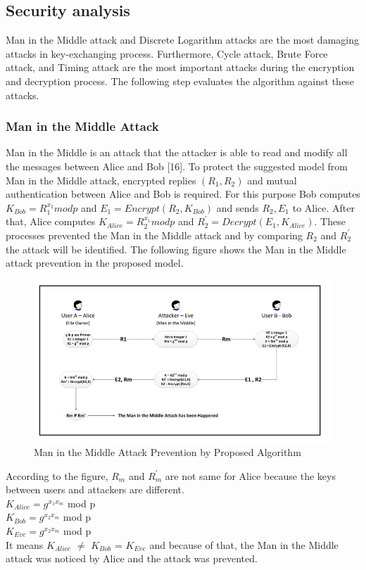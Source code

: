 \pagebreak
\subsection{Security analysis}
Man in the Middle attack and Discrete Logarithm attacks
are the most damaging attacks in key-exchanging process.
Furthermore, Cycle attack, Brute Force attack, and Timing
attack are the most important attacks during the encryption
and decryption process. The following step evaluates the
algorithm against these attacks.
\subsubsection{Man in the Middle Attack}
Man in the Middle is an attack that the attacker is able to
read and modify all the messages between Alice and Bob [16].
To protect the suggested model from Man in the Middle
attack, encrypted replies $(R_{1},R_{2})$ and mutual
authentication between Alice  and Bob  is
required. For this purpose Bob computes
$K_{Bob} = R_{1}^{x_{2}} mod p$
and $E_{1}=Encrypt(R_{2},K_{Bob})$ and sends $ R_{2},E_{1}$ to Alice.
After that, Alice computes $K_{Alice} = R_{2}^{x_{1}} mod p$
and $R^{'}_{2}=Decrypt(E_{1},K_{Alice}).$
These processes prevented the Man in the Middle attack and by comparing $R_{2}$ and $R^{'}_{2}$ the attack will be identified. The following figure shows the Man in the Middle attack prevention in the proposed model.

\vspace{-10pt}
\begin{figure}[H]
	\centering
	\includegraphics[width=160mm]{images/maninmiddle.png}{}
	\caption{ Man in the Middle Attack Prevention by Proposed Algorithm} %
	\label{figmaninmiddle} %
\end{figure}

According to the figure, $R_{m}$ and $R^{'}_{m}$ are not same for
Alice because the keys between users and attackers are
different.\\
{$K_{Alice} = g^{x_{1}{x_{m}}}$ mod p}\\
{$K_{Bob} = g^{x_{2}{x_{m}}}$ mod p}\\
{$K_{Eve} = g^{x_{2}{x_{m}}}$ mod p}\\
It means $K_{Alice}$ $\neq$ $K_{Bob}$ = $K_{Eve}$  and because of that, the
Man in the Middle attack was noticed by Alice and the attack
was prevented.

